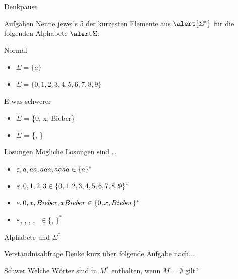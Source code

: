 {
\begin{frame}[fragile]{Denkpause}
    \begin{alertblock}{Aufgaben}
    Nenne jeweils 5 der kürzesten Elemente aus $\alert{\Sigma^{*}}$ für die folgenden Alphabete $\alert\Sigma$:
    \end{alertblock}
    
    \begin{block}{Normal}
        \begin{itemize}
            \item $\Sigma = \{a\}$
            \item $\Sigma = \{0, 1, 2, 3, 4, 5, 6, 7, 8, 9\}$
        \end{itemize}
    \end{block}
    \begin{block}{Etwas schwerer}
        \begin{itemize}
            \item $\Sigma$ = \{0, x, Bieber\}
            \item $\Sigma$ = \{\Smiley, \Frowny\}
        \end{itemize}
    \end{block}
\end{frame}
}

{
\begin{frame}{Lösungen}
    Mögliche Lösungen sind \dots
  \begin{itemize}[<+- | alert@+>]
        \item $\varepsilon, a, aa, aaa, aaaa \in \{a\}^{*}$
        \item $\varepsilon, 0, 1, 2, 3\in \{0,1,2,3,4,5,6,7,8,9\}^{*}$
        \item $\varepsilon, 0, x, Bieber, xBieber \in \{0, x, Bieber\}^{*}$
        \item $\varepsilon$, \Smiley, \Frowny, \Smiley\Smiley, \Smiley\Frowny$\; \in \{$\Smiley, \Frowny$\}^{*}$
    \end{itemize}
\end{frame}
}

\begin{frame}[fragile]{Alphabete und $\Sigma^{*}$}
\begin{alertblock}{Verständnisabfrage}
    Denke kurz über folgende Aufgabe nach...
    \end{alertblock}
    
    \begin{block}{Schwer}
        Welche Wörter sind in $M^{*}$ enthalten, wenn $M = \emptyset$ gilt?
    \end{block}
\end{frame}

